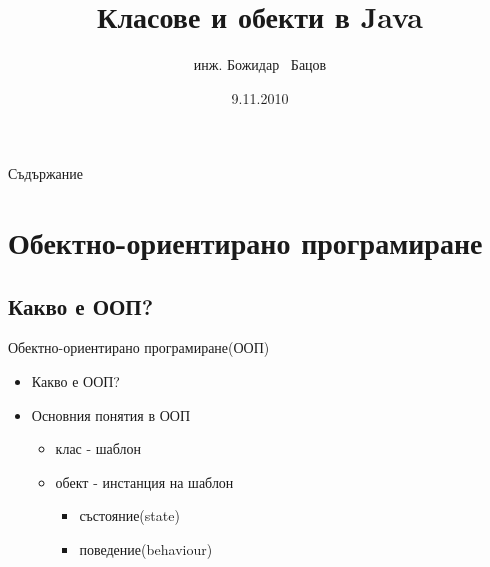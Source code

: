 \documentclass{beamer}
\title{Класове и обекти в Java}
\author{инж. Божидар ~Бацов}
\institute{Drow Ltd.}
\date{9.11.2010}
\begin{document}
\begin{frame}
  \titlepage
\end{frame}

\begin{frame}{Съдържание}
  \tableofcontents[pausesections]
\end{frame}

\section{Обектно-ориентирано програмиране}

\subsection{Какво е ООП?}

\begin{frame}{Обектно-ориентирано програмиране(ООП)}
  \transdissolve
  \begin{itemize}
  \item Какво е ООП? \pause
  \item Основния понятия в ООП
    \begin{itemize}
    \item клас - шаблон \pause
    \item обект - инстанция на шаблон \pause
      \begin{itemize}
      \item състояние(state) \pause
      \item поведение(behaviour)
      \end{itemize}
    \end{itemize}
  \end{itemize}
\end{frame}
\end{document}
